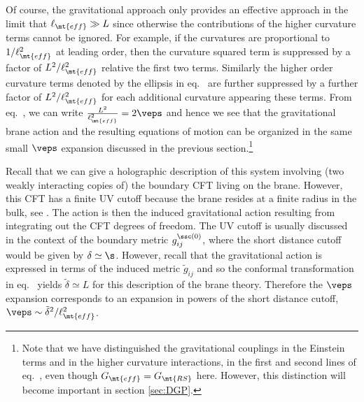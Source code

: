 Of course, the gravitational approach only provides an effective approach in the limit that $\ell_\mt{eff}\gg L$ since otherwise the contributions of the higher curvature terms cannot be ignored.
For example, if the curvatures are proportional to $1/\ell_\mt{eff}^2$ at leading order, then the curvature squared term is suppressed by a factor of $L^2/\ell_\mt{eff}^2$ relative the first two terms. Similarly the higher order curvature terms denoted by the ellipsis in eq.~ are further suppressed by a further factor of $L^2/\ell_\mt{eff}^2$ for each additional curvature appearing these terms. From eq.~, we can write $\frac{L^2}{\ell_\mt{eff}^2}=2\veps$ and hence we see that the gravitational brane action and the resulting equations of motion can be organized in the same small $\veps$ expansion discussed in the previous section.\footnote{Note that we have distinguished the gravitational couplings in the Einstein terms and in the higher curvature interactions, \ie in the first and second lines of eq.~, even though $G_\mt{eff}=G_\mt{RS}$ here. However, this distinction will become important in section \ref{sec:DGP}.}

Recall that we can give a holographic description of this system involving (two weakly interacting copies of) the boundary CFT living on the brane. However, this CFT has a finite UV cutoff because the brane resides at a finite radius in the bulk, \eg see \cite{deHaro:2000vlm,Emparan:2006ni,Myers:2013lva}. The action  is then the induced gravitational action resulting from integrating out the CFT degrees of freedom. The UV cutoff is usually discussed in the context of the boundary metric $g^{\ssc (0)}_{ij}$, where the short distance cutoff would be given by $\delta\simeq\s$.  However, recall that the gravitational action  is expressed in terms of the induced metric $\tilde g_{ij}$ and so the conformal transformation in eq.~ yields $\tilde\delta\simeq L$ for this description of the brane theory. Therefore the $\veps$ expansion corresponds to an expansion in powers of the short distance cutoff, \ie $\veps\sim\tilde \delta^2/\ell_\mt{eff}^2$.
